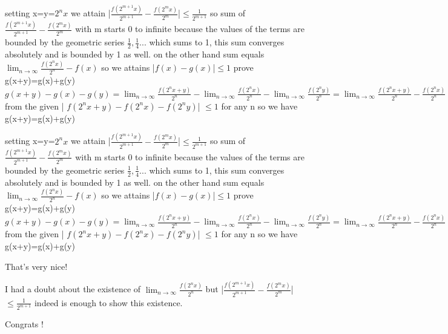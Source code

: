 \begin{solution}
	setting x=y=$ 2^nx$ we attain |$ \frac {f(2^{m + 1}x)}{2^{m + 1}} - \frac {f(2^{m}x)}{2^m}$|$ \le \frac{1}{2^{m + 1}}$
so sum of $ \frac {f(2^{m + 1}x)}{2^{m + 1}} - \frac {f(2^{m}x)}{2^m}$ with m starts 0 to infinite 
because the values of the terms are bounded by the geometric series $ \frac {1}{2}, \frac{1}{4}...$ which sums to 1, this sum converges absolutely and is bounded by 1 as well. on the other hand sum equals 
$ \lim_{n\to\infty} {\frac {f(2^{n}x)}{2^n}} - f(x)$
so we attains |$ f(x) - g(x)$|$ \le 1$
 prove  g(x+y)=g(x)+g(y)
$ g(x + y) - g(x) - g(y) = \lim_{n\to\infty} {\frac {f(2^{n}{x + y})}{2^n}} - \lim_{n\to\infty} {\frac {f(2^{n}x)}{2^n}} - \lim_{n\to\infty} {\frac {f(2^{n}y)}{2^n}} = \lim_{n\to\infty} {\frac {f(2^{n}{x + y})}{2^n} - \frac {f(2^{n}x)}{2^n} - \frac {f(2^{n}y)}{2^n}}$
from the given | $ f(2^{n}{x + y}) - f(2^{n}x) - f(2^{n}y)$| $ \le 1$ for any n
so we have g(x+y)=g(x)+g(y)
\end{solution}



\begin{solution}
	\begin{tcolorbox}setting x=y=$ 2^nx$ we attain |$ \frac {f(2^{m + 1}x)}{2^{m + 1}} - \frac {f(2^{m}x)}{2^m}$|$ \le \frac {1}{2^{m + 1}}$
so sum of $ \frac {f(2^{m + 1}x)}{2^{m + 1}} - \frac {f(2^{m}x)}{2^m}$ with m starts 0 to infinite 
because the values of the terms are bounded by the geometric series $ \frac {1}{2}, \frac {1}{4}...$ which sums to 1, this sum converges absolutely and is bounded by 1 as well. on the other hand sum equals 
$ \lim_{n\to\infty} {\frac {f(2^{n}x)}{2^n}} - f(x)$
so we attains |$ f(x) - g(x)$|$ \le 1$
 prove  g(x+y)=g(x)+g(y)
$ g(x + y) - g(x) - g(y) = \lim_{n\to\infty} {\frac {f(2^{n}{x + y})}{2^n}} - \lim_{n\to\infty} {\frac {f(2^{n}x)}{2^n}} - \lim_{n\to\infty} {\frac {f(2^{n}y)}{2^n}} = \lim_{n\to\infty} {\frac {f(2^{n}{x + y})}{2^n} - \frac {f(2^{n}x)}{2^n} - \frac {f(2^{n}y)}{2^n}}$
from the given | $ f(2^{n}{x + y}) - f(2^{n}x) - f(2^{n}y)$| $ \le 1$ for any n
so we have g(x+y)=g(x)+g(y)\end{tcolorbox}

That's very nice! 

I had a doubt about the existence of $ \lim_{n\to\infty} {\frac {f(2^{n}x)}{2^n}}$ but |$ \frac {f(2^{m + 1}x)}{2^{m + 1}} - \frac {f(2^{m}x)}{2^m}$|$ \le \frac {1}{2^{m + 1}}$ indeed is enough to show this existence.


Congrats !
\end{solution}



